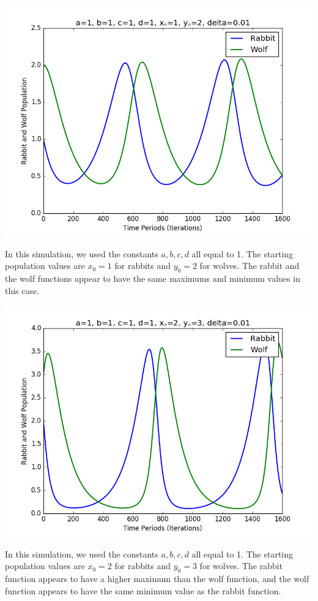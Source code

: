 \documentclass{article}
\begin{document}
\newpage
\centerline{\includegraphics[scale=0.5]{exercise5/figure_1-6.png}}
In this simulation, we used the constants $a, b, c, d$ all equal to 1.
The starting population values are $x_0=1$ for rabbits and $y_0=2$ for wolves.
The rabbit and the wolf functions appear to have the same maximums and minimum values in this case.\\
\centerline{\includegraphics[scale=0.5]{exercise5/figure_1-1.png}}
In this simulation, we used the constants $a, b, c, d$ all equal to 1.
The starting population values are $x_0=2$ for rabbits and $y_0=3$ for wolves.
The rabbit function appears to have a higher maximum than the wolf function, and the wolf function appears to have the same minimum value as the rabbit function.
\end{document}
